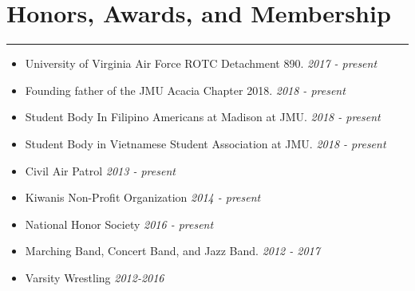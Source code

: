 \documentclass[a4paper]{article}
\begin{document}
\section*{Honors, Awards, and Membership}
\hrule
\vspace{3mm}
\begin{itemize}
	\setlength\itemsep{-0.7mm}
	\item University of Virginia Air Force ROTC Detachment 890.
	\hfill \textit{2017 - present}
	\item Founding father of the JMU Acacia Chapter 2018.
	\hfill \textit{2018 - present}
	\item Student Body In Filipino Americans at Madison at JMU.
	\hfill \textit{2018 - present}
	\item Student Body in Vietnamese Student Association at JMU.
	\hfill \textit{2018 - present}
	\item Civil Air Patrol
	\hfill \textit{2013 - present}
	\item Kiwanis Non-Profit Organization
	\hfill \textit{2014 - present}
	\item National Honor Society
	\hfill \textit{2016 - present}
	\item Marching Band, Concert Band, and Jazz Band.
	\hfill \textit{2012 - 2017}
	\item Varsity Wrestling
	\hfill \textit{2012-2016}
\end{itemize}
\end{document}
